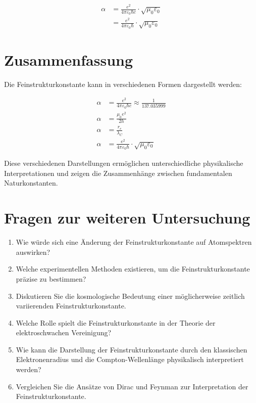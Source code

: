 \documentclass{article}
\begin{document}
	\begin{align}
		\alpha &= \frac{e^2}{4\pi\varepsilon_0\hbar c} \cdot \sqrt{\mu_0\varepsilon_0}\\
		&= \frac{e^2}{4\pi\varepsilon_0\hbar} \cdot \sqrt{\mu_0\varepsilon_0}
	\end{align}
	
	\section{Zusammenfassung}
	Die Feinstrukturkonstante kann in verschiedenen Formen dargestellt werden:
	
	\begin{align}
		\alpha &= \frac{e^2}{4\pi\varepsilon_0\hbar c} \approx \frac{1}{137.035999}\\
		\alpha &= \frac{\mu_0e^2}{2h}\\
		\alpha &= \frac{r_e}{\lambda_C}\\
		\alpha &= \frac{e^2}{4\pi\varepsilon_0\hbar} \cdot \sqrt{\mu_0\varepsilon_0}
	\end{align}
	
	Diese verschiedenen Darstellungen ermöglichen unterschiedliche physikalische Interpretationen und zeigen die Zusammenhänge zwischen fundamentalen Naturkonstanten.
	
	\section{Fragen zur weiteren Untersuchung}
	
	\begin{enumerate}
		\item Wie würde sich eine Änderung der Feinstrukturkonstante auf Atomspektren auswirken?
		\item Welche experimentellen Methoden existieren, um die Feinstrukturkonstante präzise zu bestimmen?
		\item Diskutieren Sie die kosmologische Bedeutung einer möglicherweise zeitlich variierenden Feinstrukturkonstante.
		\item Welche Rolle spielt die Feinstrukturkonstante in der Theorie der elektroschwachen Vereinigung?
		\item Wie kann die Darstellung der Feinstrukturkonstante durch den klassischen Elektronenradius und die Compton-Wellenlänge physikalisch interpretiert werden?
		\item Vergleichen Sie die Ansätze von Dirac und Feynman zur Interpretation der Feinstrukturkonstante.
	\end{enumerate}
\end{document}
